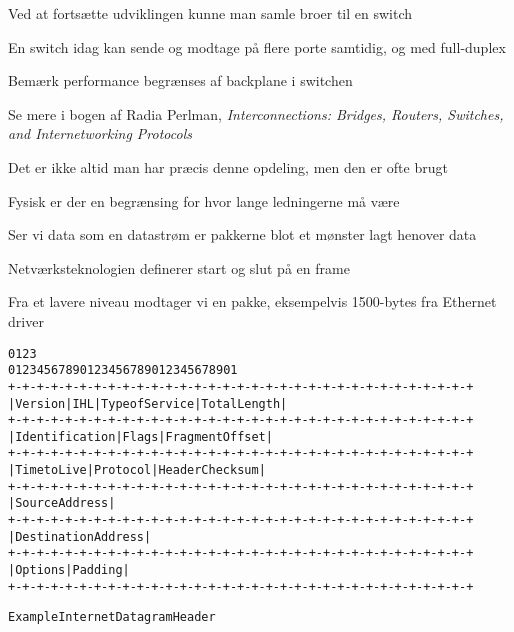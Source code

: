 \documentclass[Screen16to9,17pt]{foils}
\begin{document}

\begin{list1}
\item Ved at fortsætte udviklingen kunne man samle broer til en switch
\item En switch idag kan sende og modtage på flere porte samtidig, og med full-duplex
\item Bemærk performance begrænses af backplane i switchen
\end{list1}



Se mere i bogen af Radia Perlman, \emph{Interconnections: Bridges, Routers, Switches, and Internetworking Protocols}



\centerline{Det er ikke altid man har præcis denne opdeling, men den er ofte brugt}


\centerline{Fysisk er der en begrænsing for hvor lange ledningerne må være}



\begin{list1}
\item Ser vi data som en datastrøm er pakkerne blot et mønster lagt henover data
\item Netværksteknologien definerer start og slut på en frame
\item Fra et lavere niveau modtager vi en pakke, eksempelvis 1500-bytes fra Ethernet driver
\end{list1}


\begin{alltt}
\small
    0                   1                   2                   3
    0 1 2 3 4 5 6 7 8 9 0 1 2 3 4 5 6 7 8 9 0 1 2 3 4 5 6 7 8 9 0 1
   +-+-+-+-+-+-+-+-+-+-+-+-+-+-+-+-+-+-+-+-+-+-+-+-+-+-+-+-+-+-+-+-+
   |Version|  IHL  |Type of Service|          Total Length         |
   +-+-+-+-+-+-+-+-+-+-+-+-+-+-+-+-+-+-+-+-+-+-+-+-+-+-+-+-+-+-+-+-+
   |         Identification        |Flags|      Fragment Offset    |
   +-+-+-+-+-+-+-+-+-+-+-+-+-+-+-+-+-+-+-+-+-+-+-+-+-+-+-+-+-+-+-+-+
   |  Time to Live |    Protocol   |         Header Checksum       |
   +-+-+-+-+-+-+-+-+-+-+-+-+-+-+-+-+-+-+-+-+-+-+-+-+-+-+-+-+-+-+-+-+
   |                       Source Address                          |
   +-+-+-+-+-+-+-+-+-+-+-+-+-+-+-+-+-+-+-+-+-+-+-+-+-+-+-+-+-+-+-+-+
   |                    Destination Address                        |
   +-+-+-+-+-+-+-+-+-+-+-+-+-+-+-+-+-+-+-+-+-+-+-+-+-+-+-+-+-+-+-+-+
   |                    Options                    |    Padding    |
   +-+-+-+-+-+-+-+-+-+-+-+-+-+-+-+-+-+-+-+-+-+-+-+-+-+-+-+-+-+-+-+-+

                    Example Internet Datagram Header
\end{alltt}
\end{document}
